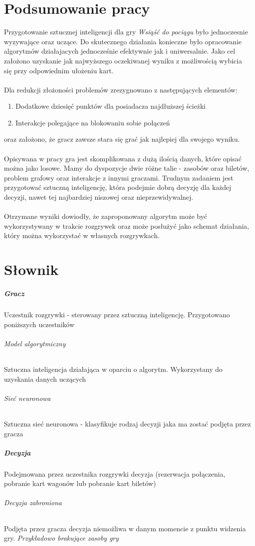 \documentclass[12pt, oneside]{report}
\begin{document}
\chapter{Podsumowanie pracy}
Przygotowanie sztucznej inteligencji dla gry \textit{Wsiąść do pociągu} było jednoczesnie wyzywające oraz uczące. Do skutecznego działania konieczne było opracowanie algorytmów działajacych jednocześnie efektywnie jak i uniwersalnie. Jako cel założono uzyskanie jak najwyższego oczekiwanej wyniku z możliwością wybicia się przy odpowiednim ułożeniu kart. \\ \\ 
Dla redukcji złożoności problemów zrezygnowano z następujących elementów:
\begin{enumerate}
	\item Dodatkowe dziesięć punktów dla posiadacza najdłuższej ścieżki
	\item Interakcje polegające na blokowaniu sobie połączeń
\end{enumerate}
oraz założono, że gracz zawsze stara się grać jak najlepiej dla swojego wyniku. \\ \\  
Opisywana w pracy gra jest skomplikowana z dużą ilością danych, które opisać można jako losowe. Mamy do dyspozycje dwie różne talie - zasobów oraz biletów, problem grafowy oraz interakcje z innymi graczami. Trudnym zadaniem jest przygotować sztuczną inteligencję, która podejmie dobrą decyzję dla każdej decyzji, nawet tej najbardziej niszowej oraz nieprzewidywalnej. \\ \\ 
Otrzymane wyniki dowiodły, że zaproponowany algorytm może być wykorzystywany w trakcie rozgrywek oraz może posłużyć jako schemat działania, który można wykorzystać w własnych rozgrywkach. 
\chapter{Słownik}
\label{chap:dictionary}
\paragraph{Gracz}
Uczestnik rozgrywki - sterowany przez sztuczną inteligencję. Przygotowano poniższych uczestników
\subparagraph{Model algorytmiczny} Sztuczna inteligencja działająca w oparciu o algorytm. Wykorzystany do uzyskania danych uczących
\subparagraph{Sieć neuronowa} Sztuczna sieć neuronowa - klasyfikuje rodzaj decyzji jaka ma zostać podjęta przez gracza
\paragraph{Decyzja}
Podejmowana przez uczestnika rozgrywki decyzja (rezerwacja połączenia, pobranie kart wagonów lub pobranie kart biletów)
\subparagraph{Decyzja zabroniona}
Podjęta przez gracza decyzja niemożliwa w danym momencie z punktu widzenia gry. \textit{Przykładowo brakujące zasoby gry}
\end{document}
